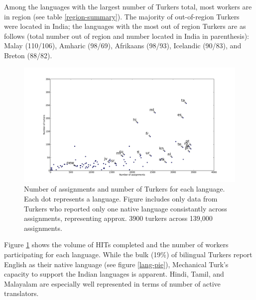 \documentclass[11pt]{article}
\begin{document}
Among the languages with the largest number of Turkers total, most workers are in region (see table \ref{region-summary}). The majority of out-of-region Turkers were located in India; the languages with the most out of region Turkers are as follows (total number out of region and number located in India in parenthesis): Malay (110/106), Amharic (98/69), Afrikaans (98/93), Icelandic (90/83), and Breton (88/82).

\begin{figure}[h]
\centering
\includegraphics[width=6in]{final-figures/assign-turk-scatter}
\caption{Number of assignments and number of Turkers for each language. Each dot represents a language. Figure includes only data from Turkers who reported only one native language consistantly across assignments, representing approx. 3900 turkers across 139,000 assignments.}
\label{ass-scatter}
\end{figure}

Figure \ref{ass-scatter} shows the volume of HITs completed and the number of workers participating for each language. While the bulk (19\%) of bilingual Turkers report English as their native language (see figure \ref{lang-pie}), Mechanical Turk's capacity to support the Indian languages is apparent. Hindi, Tamil, and Malayalam are especially well represented in terms of number of active translators. 
\end{document}

